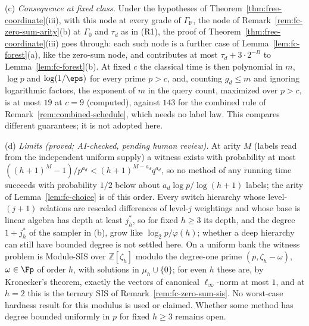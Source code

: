 \begin{remark}
\textup{(c)} \emph{Consequence at fixed class.} Under the hypotheses of Theorem~\ref{thm:free-coordinate}(iii), with this node at every grade of $\Gamma_{\mathrm F}$, the node of Remark~\ref{rem:fc-zero-sum-arity}(b) at $\Gamma_0$ and $\tau_d$ as in (R1), the proof of Theorem~\ref{thm:free-coordinate}(iii) goes through: each such node is a further case of Lemma~\ref{lem:fc-forest}(a), like the zero-sum node, and contributes at most $\tau_d + 3\cdot2^{-B}$ to Lemma~\ref{lem:fc-forest}(b). At fixed $c$ the classical time is then polynomial in $m$, $\log p$ and $\log(1/\eps)$ for every prime $p > c$, and, counting $g_d \le m$ and ignoring logarithmic factors, the exponent of $m$ in the query count, maximized over $p > c$, is at most $19$ at $c = 9$ (computed), against $143$ for the combined rule of Remark~\ref{rem:combined-schedule}, which needs no label law. This compares different guarantees; it is not adopted here.

\textup{(d)} \emph{Limits (proved; AI-checked, pending human review).} At arity $M$ (labels read from the independent uniform supply) a witness exists with probability at most $((h+1)^M-1)/p^{a_d} < (h+1)^{M-a_d}q^{a_d}$, so no method of any running time succeeds with probability $1/2$ below about $a_d\log p/\log(h+1)$ labels; the arity of Lemma~\ref{lem:fc-choice} is of this order. Every switch hierarchy whose level-$(j+1)$ relations are rescaled differences of level-$j$ weightings and whose base is linear algebra has depth at least $j^*_h$, so for fixed $h \ge 3$ its depth, and the degree $1 + j^*_h$ of the sampler in (b), grow like $\log_2p/\varphi(h)$; whether a deep hierarchy can still have bounded degree is not settled here. On a uniform bank the witness problem is Module-SIS over $\mathbb{Z}[\zeta_h]$ modulo the degree-one prime $(p,\zeta_h-\omega)$, $\omega \in \Fp$ of order $h$, with solutions in $\mu_h\cup\{0\}$; for even $h$ these are, by Kronecker's theorem, exactly the vectors of canonical $\ell_\infty$-norm at most $1$, and at $h = 2$ this is the ternary SIS of Remark~\ref{rem:fc-zero-sum-sis}. No worst-case hardness result for this modulus is used or claimed. Whether some method has degree bounded uniformly in $p$ for fixed $h \ge 3$ remains open.
\end{remark}
